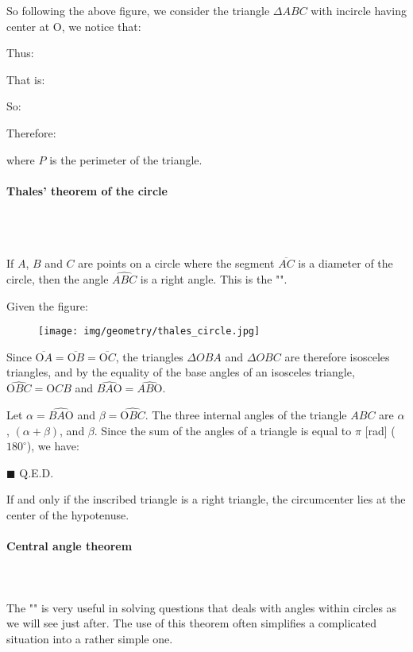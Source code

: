 	So following the above figure, we consider the triangle $\Delta ABC$ with incircle having center at O, we notice that:
	
	Thus:
	
	That is:
	
	So:
	
	Therefore:
	
	where $P$ is the perimeter of the triangle.
	
	\pagebreak
	\paragraph{Thales' theorem of the circle}\mbox{}\\\\
	\begin{theorem}
	If $A$, $B$ and $C$ are points on a circle where the segment $\overline{AC}$ is a diameter of the circle, then the angle $\widehat{ABC}$ is a right angle. This is the "".
	\end{theorem}
	\begin{dem}
	Given the figure:
	\begin{figure}[H]
		\centering
		\texttt{[image: img/geometry/thales\_circle.jpg]}
	\end{figure}	
	Since $\overline{\text{O}A} = \overline{\text{O}B} = \overline{\text{O}C}$, the triangles $\Delta OBA$ and $\Delta OBC$ are therefore isosceles triangles, and by the equality of the base angles of an isosceles triangle, $\widehat{\text{O}BC} = \widehat{\text{O}CB}$ and $\widehat{BA\text{O}} = \widehat{AB\text{O}}$.

	Let $\alpha = \widehat{BA\text{O}}$ and $\beta = \widehat{\text{O}BC}$. The three internal angles of the  triangle $ABC$ are $\alpha$, $(\alpha + \beta)$, and $\beta$. Since the sum of the angles of a triangle is equal to $\pi$ [rad] ($180^\circ$), we have:
	
	\begin{flushright}
		$\blacksquare$  Q.E.D.
	\end{flushright}
	\end{dem}
	\begin{corollary}
	If and only if the inscribed triangle is a right triangle, the circumcenter lies at the center of the hypotenuse.
	\end{corollary}
	
	\pagebreak
	\paragraph{Central angle theorem}\mbox{}\\\\
	The "" is very useful in solving questions that deals with angles within circles as we will see just after. The use of this theorem often simplifies a complicated situation into a rather simple one.
	
